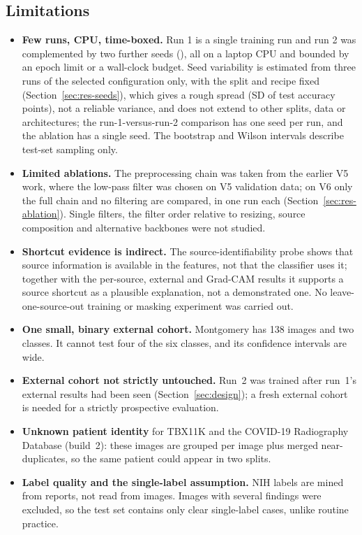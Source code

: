 \subsection{Limitations}
\label{sec:limitations}
\begin{itemize}
\item \textbf{Few runs, CPU, time-boxed.} Run 1 is a single training run and run 2 was complemented by two further seeds (\RMSSeeds), all on a laptop CPU and bounded by an epoch limit or a wall-clock budget. Seed variability is estimated from three runs of the selected configuration only, with the split and recipe fixed (Section~\ref{sec:res-seeds}), which gives a rough spread (SD of test accuracy \RMSTestAccSD{} points), not a reliable variance, and does not extend to other splits, data or architectures; the run-1-versus-run-2 comparison has one seed per run, and the ablation has a single seed. The bootstrap and Wilson intervals describe test-set sampling only.
\item \textbf{Limited ablations.} The preprocessing chain was taken from the earlier V5 work, where the low-pass filter was chosen on V5 validation data; on V6 only the full chain and no filtering are compared, in one run each (Section~\ref{sec:res-ablation}). Single filters, the filter order relative to resizing, source composition and alternative backbones were not studied.
\item \textbf{Shortcut evidence is indirect.} The source-identifiability probe shows that source information is available in the features, not that the classifier uses it; together with the per-source, external and Grad-CAM results it supports a source shortcut as a plausible explanation, not a demonstrated one. No leave-one-source-out training or masking experiment was carried out.
\item \textbf{One small, binary external cohort.} Montgomery has 138 images and two classes. It cannot test four of the six classes, and its confidence intervals are wide.
\item \textbf{External cohort not strictly untouched.} Run~2 was trained after run~1's external results had been seen (Section~\ref{sec:design}); a fresh external cohort is needed for a strictly prospective evaluation.
\item \textbf{Unknown patient identity} for TBX11K and the COVID-19 Radiography Database (build~2): these images are grouped per image plus merged near-duplicates, so the same patient could appear in two splits.
\item \textbf{Label quality and the single-label assumption.} NIH labels are mined from reports, not read from images. Images with several findings were excluded, so the test set contains only clear single-label cases, unlike routine practice.

\end{itemize}
